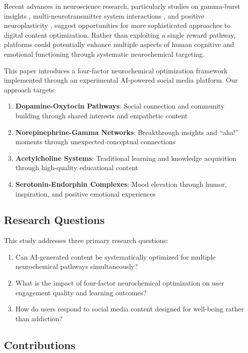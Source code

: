 \documentclass[11pt,letterpaper]{article}
\begin{document}
Recent advances in neuroscience research, particularly studies on gamma-burst insights \cite{kounios2014}, multi-neurotransmitter system interactions \cite{hasselmo2006}, and positive neuroplasticity \cite{stellar2015}, suggest opportunities for more sophisticated approaches to digital content optimization. Rather than exploiting a single reward pathway, platforms could potentially enhance multiple aspects of human cognitive and emotional functioning through systematic neurochemical targeting.

This paper introduces a four-factor neurochemical optimization framework implemented through an experimental AI-powered social media platform. Our approach targets:

\begin{enumerate}
    \item \textbf{Dopamine-Oxytocin Pathways}: Social connection and community building through shared interests and empathetic content
    \item \textbf{Norepinephrine-Gamma Networks}: Breakthrough insights and ``aha!'' moments through unexpected conceptual connections
    \item \textbf{Acetylcholine Systems}: Traditional learning and knowledge acquisition through high-quality educational content
    \item \textbf{Serotonin-Endorphin Complexes}: Mood elevation through humor, inspiration, and positive emotional experiences
\end{enumerate}

\subsection{Research Questions}

This study addresses three primary research questions:

\begin{enumerate}
    \item Can AI-generated content be systematically optimized for multiple neurochemical pathways simultaneously?
    \item What is the impact of four-factor neurochemical optimization on user engagement quality and learning outcomes?
    \item How do users respond to social media content designed for well-being rather than addiction?
\end{enumerate}

\subsection{Contributions}
\end{document}
